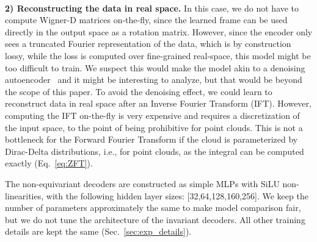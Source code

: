\\
\textbf{2) Reconstructing the data in real space.} In this case, we do not have to compute Wigner-D
matrices on-the-fly, since the learned frame can be used directly in the output space as a rotation
matrix. However, since the encoder only sees a truncated Fourier representation of the data, which
is by construction lossy, while the loss is computed over fine-grained real-space, this model might
be too difficult to train. We suspect this would make the model akin to a denoising
autoencoder~\cite{vincent_extracting_2008} and it might be interesting to analyze, but that would
be beyond the scope of this paper. To avoid the denoising effect, we could learn to reconstruct
data in real space after an Inverse Fourier Transform (IFT). However, computing the IFT on-the-fly
is very expensive and requires a discretization of the input space, to the point of being
prohibitive for point clouds. This is not a bottleneck for the Forward Fourier Transform if the
cloud is parameterized by Dirac-Delta distributions, i.e., for point clouds, as the integral can be
computed exactly (Eq.~\ref{eq:ZFT}).


\begin{table}[h]
\begin{center}
    \caption{\textbf{Performance comparison between our H-(V)AE and a H-(V)AE with
    ref.~\cite{winter_unsupervised_2022}'s non-equivariant decoder formulation, on the
    MNIST-on-the-sphere dataset.}}
    \medskip
    \small
    \justifying
    The non-equivariant decoders are constructed as simple MLPs with SiLU non-linearities, with the
    following hidden layer sizes: [32,64,128,160,256]. We keep the number of parameters
    approximately the same to make model comparison fair, but we do not tune the architecture of
    the invariant decoders. All other training details are kept the same
    (Sec.~\ref{sec:exp_details}).
\label{table:mlp_decoder_comparison}
\end{center}
\end{table}


